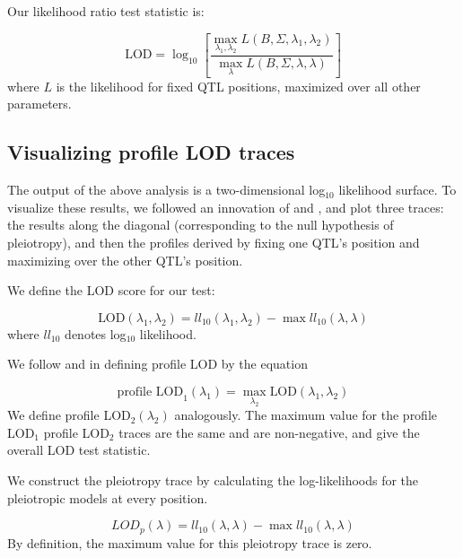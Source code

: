\documentclass[oneside]{book}\usepackage[]{graphicx}\usepackage[]{color}
\begin{document}
\noindent Our likelihood ratio test statistic is:

\begin{equation}
\text{LOD} = \log_{10} \left[ \frac{\max_{\lambda_1, \lambda_2} L(B, \Sigma, \lambda_1, \lambda_2)}{
    \max_\lambda L(B, \Sigma, \lambda, \lambda)} \right]
\label{eqn:test-statistic}
\end{equation}
where $L$ is the likelihood for fixed QTL positions,
maximized over all other parameters.

\subsection{Visualizing profile LOD traces}

The output of the above analysis is a two-dimensional log$_{10}$ likelihood
surface. To visualize these results, we followed an innovation of \citet{zeng2000genetic} and
\citet{tian2016dissection}, and plot three traces: the results along the
diagonal (corresponding to the null hypothesis of pleiotropy), and
then the profiles derived by fixing one QTL's position
and maximizing over the other QTL's position.

We define the LOD score for our test:

\begin{equation}
\text{LOD}(\lambda_1, \lambda_2) = ll_{10}(\lambda_1, \lambda_2) - \max ll_{10}(\lambda, \lambda)
\label{eq:lodpvl}
\end{equation}
where $ll_{10}$ denotes log$_{10}$ likelihood.

We follow \citet{zeng2000genetic} and \citet{tian2016dissection} in
defining profile LOD by the equation

\begin{equation}
\text{profile LOD}_1(\lambda_1) = \max_{\lambda_2}\text{LOD}(\lambda_1, \lambda_2)
\label{eq:profilelod}
\end{equation}
We define profile LOD$_2(\lambda_2)$ analogously.
The maximum value for the profile LOD$_1$
profile LOD$_2$ traces are the same and are non-negative, and give the
overall LOD test statistic.

We construct the pleiotropy trace by calculating the log-likelihoods
for the pleiotropic models at every position.

\begin{equation}
LOD_{p}(\lambda) = ll_{10}(\lambda, \lambda) - \max ll_{10}(\lambda, \lambda)
\label{eq:lodp}
\end{equation}
By definition, the maximum value for this pleiotropy trace
is zero.
\end{document}
